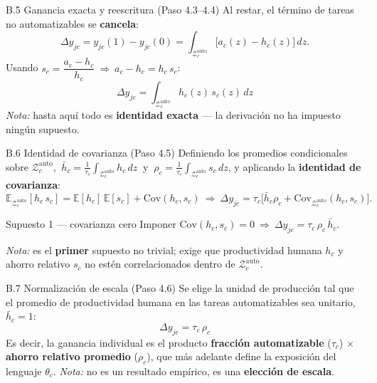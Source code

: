\documentclass[10pt,aspectratio=169]{beamer}
\begin{document}
\begin{frame}{B.5 Ganancia exacta y reescritura (Paso 4.3--4.4)}
\small
Al restar, el término de tareas no automatizables se \textbf{cancela}:
\[
\Delta y_{jc}=y_{jc}(1)-y_{jc}(0)=\int_{\mathcal{Z}^{\mathrm{auto}}_c}\!\bigl[a_c(z)-h_c(z)\bigr]\,dz.
\]
Usando $s_c=\dfrac{a_c-h_c}{h_c}\ \Rightarrow\ a_c-h_c=h_c\,s_c$:
\[
\boxed{\ \Delta y_{jc}=\int_{\mathcal{Z}^{\mathrm{auto}}_c}\!h_c(z)\,s_c(z)\,dz\ }
\]
{\footnotesize\textit{Nota:} hasta aquí todo es \textbf{identidad exacta} --- la derivación no ha impuesto ningún supuesto.}
\end{frame}

\begin{frame}{B.6 Identidad de covarianza (Paso 4.5)}
\small
Definiendo los promedios condicionales sobre $\mathcal{Z}^{\mathrm{auto}}_c$,
$\ \bar h_c=\tfrac{1}{\tau_c}\!\int_{\mathcal{Z}^{\mathrm{auto}}_c}\!h_c\,dz\ $ y $\ \rho_c=\tfrac{1}{\tau_c}\!\int_{\mathcal{Z}^{\mathrm{auto}}_c}\!s_c\,dz$, y aplicando la \textbf{identidad de covarianza}:
\[
\mathbb{E}_{\mathcal{Z}^{\mathrm{auto}}_c}[h_c\,s_c]=\mathbb{E}[h_c]\,\mathbb{E}[s_c]+\mathrm{Cov}(h_c,s_c)
\ \Rightarrow\
\Delta y_{jc}=\tau_c\bigl[\bar h_c\rho_c+\mathrm{Cov}_{\mathcal{Z}^{\mathrm{auto}}_c}(h_c,s_c)\bigr].
\]
\begin{alertblock}{\small Supuesto 1 --- covarianza cero}
\centering Imponer $\mathrm{Cov}(h_c,s_c)=0\ \Rightarrow\ \Delta y_{jc}=\tau_c\,\rho_c\,\bar h_c$.
\end{alertblock}
{\footnotesize\textit{Nota:} es el \textbf{primer} supuesto no trivial; exige que productividad humana $h_c$ y ahorro relativo $s_c$ no estén correlacionados dentro de $\mathcal{Z}^{\mathrm{auto}}_c$.}
\end{frame}

\begin{frame}{B.7 Normalización de escala (Paso 4.6)}
\small
Se elige la unidad de producción tal que el promedio de productividad humana en las tareas automatizables sea unitario, $\bar h_c=1$:
\[
\boxed{\ \Delta y_{jc}=\tau_c\,\rho_c\ }
\]
Es decir, la ganancia individual es el producto \textbf{fracción automatizable} ($\tau_c$) $\times$ \textbf{ahorro relativo promedio} ($\rho_c$), que más adelante define la exposición del lenguaje $\theta_c$.
\medskip
{\footnotesize\textit{Nota:} no es un resultado empírico, es una \textbf{elección de escala}.}
\end{frame}
\end{document}
